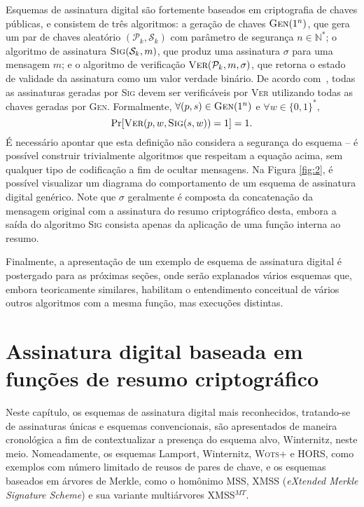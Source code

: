 \documentclass[12pt,notitlepage]{report}
\newcommand{\binwds}[1]{\{0, 1\}^{#1}}
\begin{document}
Esquemas de assinatura digital são fortemente baseados em criptografia de
chaves públicas, e consistem de três algoritmos: a geração de chaves
$\textsc{Gen}(1^n)$, que gera um par de chaves aleatório $(\mathcal{P}_k,
\mathcal{S}_k)$ com parâmetro de segurança $n \in \mathbb{N}^{*}$; o algoritmo
de assinatura $\textsc{Sig}(\mathcal{S}_k, m)$, que produz uma assinatura
$\sigma$ para uma mensagem $m$; e o algoritmo de verificação
$\textsc{Ver}(\mathcal{P}_k, m, \sigma)$, que retorna o estado de validade da
assinatura como um valor verdade binário. De acordo
com~\cite{Goldreich:2004:FCV:975541}, todas as assinaturas geradas por
\textsc{Sig} devem ser verificáveis por \textsc{Ver} utilizando todas as chaves
geradas por \textsc{Gen}. Formalmente, $\forall (p, s) \in \textsc{Gen}(1^n)$ e
$\forall w \in \binwds{*}$,
\begin{equation}
    \text{Pr}[\textsc{Ver}(p, w, \textsc{Sig}(s, w)) = 1] = 1.
\end{equation}
É necessário apontar que esta definição não considera a segurança do esquema --
é possível construir trivialmente algoritmos que respeitam a equação acima, sem
qualquer tipo de codificação a fim de ocultar mensagens.  Na Figura
\ref{fig:2}, é possível visualizar um diagrama do comportamento de um esquema
de assinatura digital genérico. Note que $\sigma$ geralmente é composta da
concatenação da mensagem original com a assinatura do resumo criptográfico
desta, embora a saída do algoritmo \textsc{Sig} consista apenas da aplicação de
uma função interna ao resumo.

Finalmente, a apresentação de um exemplo de esquema de assinatura digital é
postergado para as próximas seções, onde serão explanados vários esquemas que,
embora teoricamente similares, habilitam o entendimento conceitual de vários
outros algoritmos com a mesma função, mas execuções distintas.

\chapter{Assinatura digital baseada em funções de resumo criptográfico}

Neste capítulo, os esquemas de assinatura digital mais reconhecidos,
tratando-se de assinaturas únicas e esquemas convencionais, são apresentados
de maneira cronológica a fim de contextualizar a presença do esquema alvo,
Winternitz, neste meio. Nomeadamente, os esquemas Lamport, Winternitz,
\textsc{Wots+} e HORS, como exemplos com número limitado de reusos de pares
de chave, e os esquemas baseados em árvores de Merkle, como o homônimo MSS, XMSS
(\emph{eXtended Merkle Signature Scheme}) e sua variante multiárvores
XMSS$^{MT}$.
\end{document}
